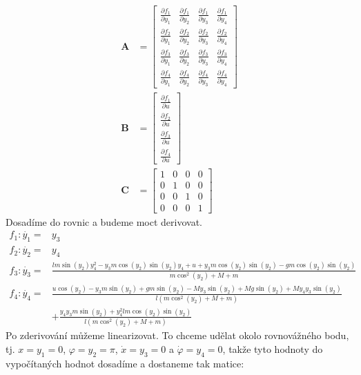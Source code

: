 \documentclass[a4paper, 12pt]{article}
\begin{document}
			\begin{align*}
				\mathbf{A} &= \left[\begin{matrix}
					\frac{\partial f_1}{\partial y_1} & \frac{\partial f_1}{\partial y_2} & \frac{\partial f_1}{\partial y_3} & \frac{\partial f_1}{\partial y_4}\\
					\frac{\partial f_2}{\partial y_1} & \frac{\partial f_2}{\partial y_2} & \frac{\partial f_2}{\partial y_3} & \frac{\partial f_2}{\partial y_4}\\
					\frac{\partial f_3}{\partial y_1} & \frac{\partial f_3}{\partial y_2} & \frac{\partial f_3}{\partial y_3} & \frac{\partial f_3}{\partial y_4}\\
					\frac{\partial f_4}{\partial y_1} & \frac{\partial f_4}{\partial y_2} & \frac{\partial f_4}{\partial y_3} & \frac{\partial f_4}{\partial y_4}	
				\end{matrix}\right]\\
				\mathbf{B} &= \left[\begin{matrix}
					\frac{\partial f_1}{\partial u}\\
					\frac{\partial f_2}{\partial u}\\
					\frac{\partial f_3}{\partial u}\\
					\frac{\partial f_4}{\partial u}
				\end{matrix}\right]\\
				\mathbf{C} &= \left[\begin{matrix}
					1 & 0 & 0 & 0\\
					0 & 1 & 0 & 0\\
					0 & 0 & 1 & 0\\
					0 & 0 & 0 & 1
				\end{matrix}\right]
			\end{align*}
			Dosadíme do rovnic a budeme moct derivovat.
			\begin{align*}
				f_1: \dot{y_1} = &y_3\\
				f_2: \dot{y_2} = &y_4\\
				f_3: \dot{y_3} = & \frac{lm\sin(y_2)y_4^2-y_3m\cos(y_2)\sin(y_2)y_4+u+y_3m\cos(y_2)\sin(y_2)-gm\cos(y_2)\sin(y_2)}{m\cos^2(y_2)+M+m}\\
				f_4: \dot{y_4} = &\frac{u\cos(y_2)-y_3m\sin(y_2)+gm\sin(y_2)-My_3\sin(y_2)+Mg\sin(y_2)+My_4y_3\sin(y_2)}{l\left(m\cos^2(y_2)+M+m\right)}\\
				&+ \frac{y_4y_3m\sin(y_2)+y_4^2lm\cos(y_2)\sin(y_2)}{l\left(m\cos^2(y_2)+M+m\right)}
			\end{align*}
			Po zderivování můžeme linearizovat. To chceme udělat okolo rovnovážného bodu, tj. $x = y_1 = 0$, $\varphi = y_2 = \pi$, $\dot{x} = y_3 = 0$ a $\dot{\varphi} = y_4 = 0$, takže tyto hodnoty do vypočítaných hodnot dosadíme a dostaneme tak matice:
\end{document}
